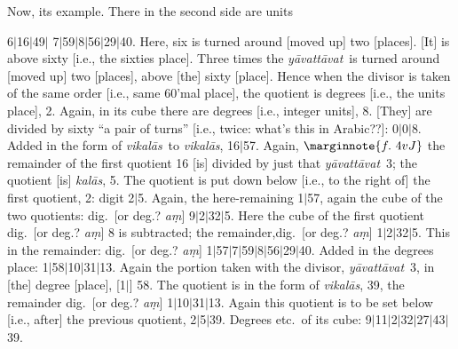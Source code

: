 \documentclass[12pt]{book}
\let\*=\d
\def\kalas{\textit{ka\-l\=as}}
\def\ya{\textit{y\=avat\-t\=avat}}
\def\vikalas{\textit{vi\-ka\-l\=as}}
\def\danda{$|$}
\begin{document}
\newpage 

Now, its example. There in the second side are units 

6\danda 16\danda 49\danda
7\danda 59\danda 8\danda 56\danda 29\danda 40. Here, six is turned around
[moved up] two [places]. [It] is above sixty [i.e., the sixties place]. 
Three times the \ya\ is turned around [moved up] two [places], above [the] sixty [place]. 
Hence when the divisor is taken of the same order [i.e., same 60'mal place],
the quotient is degrees [i.e., the
units place], 2.
Again, in its cube there are degrees [i.e., integer units], 8.
[They] are divided by sixty ``a pair of turns'' [i.e., twice: what's this in Arabic??]:
0\danda 0\danda 8. Added in the form of \vikalas\ to \vikalas,
16\danda 57.
Again,
$\marginnote{f.~4v J}$
the remainder of the first quotient 16 [is] divided by just that \ya\ 3; the quotient [is] \kalas, 5.
The quotient is put down below [i.e., to the right of] the first quotient, 2: digit 2\danda 5.
Again, the here-remaining 1\danda 57, again the cube of the two quotients: dig.\ [or deg.? \textit{a\*m}]
9\danda 2\danda 32\danda 5.  Here the cube of the first quotient  dig.\ [or deg.? \textit{a\*m}]
8 is subtracted; the remainder,dig.\ [or deg.? \textit{a\*m}]
1\danda 2\danda 32\danda 5. This in the remainder: dig.\ [or deg.? \textit{a\*m}]
1\danda 57\danda 7\danda 59\danda 8\danda 56\danda 29\danda 40. 
Added in the degrees place: 
1\danda 58\danda 10\danda 31\danda 13.
Again the portion taken with the divisor, \ya\ 3, in [the] degree [place], [1\danda] 58.
The quotient is in the form of \vikalas,
39, the remainder dig.\ [or deg.? \textit{a\*m}] 
1\danda 10\danda 31\danda 13. Again this quotient is to be set below [i.e., after] the 
previous quotient, 2\danda 5\danda 39.
Degrees etc.\ of its cube: 9\danda 11\danda 2\danda 32\danda 27\danda 43\danda 39.

\newpage
\end{document}
